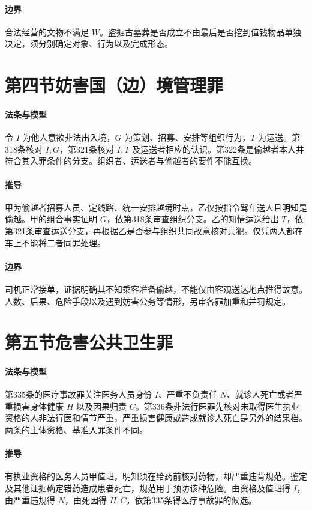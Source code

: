 \paragraph{边界}
合法经营的文物不满足 \(W\)。盗掘古墓葬是否成立不由最后是否挖到值钱物品单独决定，须分别确定对象、行为以及完成形态。

\section{第四节\quad 妨害国（边）境管理罪}

\paragraph{法条与模型}
令 \(I\) 为他人意欲非法出入境，\(G\) 为策划、招募、安排等组织行为，\(T\) 为运送。第318条核对 \(I,G\)，第321条核对 \(I,T\) 及运送者相应的认识。第322条是偷越者本人并符合其入罪条件的分支。组织者、运送者与偷越者的要件不能互换。

\paragraph{推导}
甲为偷越者招募人员、定线路、统一安排越境时点，乙仅按指令驾车送人且明知是偷越。甲的组合事实证明 \(G\)，依第318条审查组织分支。乙的知情运送给出 \(T\)，依第321条审查运送分支，再根据乙是否参与组织共同故意核对共犯。仅凭两人都在车上不能将二者同罪处理。

\paragraph{边界}
司机正常接单，证据明确其不知乘客准备偷越，不能仅由客观送达地点推得故意。人数、后果、危险手段以及遇到妨害公务等情形，另审各罪加重和并罚规定。

\section{第五节\quad 危害公共卫生罪}

\paragraph{法条与模型}
第335条的医疗事故罪关注医务人员身份 \(I\)、严重不负责任 \(N\)、就诊人死亡或者严重损害身体健康 \(H\) 以及因果归责 \(C\)。第336条非法行医罪先核对未取得医生执业资格的人非法行医和情节严重，严重损害健康或造成就诊人死亡是另外的结果档。两条的主体资格、基准入罪条件不同。

\paragraph{推导}
有执业资格的医务人员甲值班，明知须在给药前核对药物，却严重违背规范。鉴定及其他证据确定错药造成患者死亡，规范用于预防该种危险。由资格及值班得 \(I\)，由严重违规得 \(N\)，由死因得 \(H,C\)，依第335条得医疗事故罪的候选。

